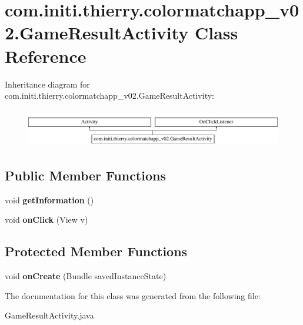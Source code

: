 \hypertarget{classcom_1_1initi_1_1thierry_1_1colormatchapp__v02_1_1_game_result_activity}{}\section{com.\+initi.\+thierry.\+colormatchapp\+\_\+v02.\+Game\+Result\+Activity Class Reference}
\label{classcom_1_1initi_1_1thierry_1_1colormatchapp__v02_1_1_game_result_activity}
Inheritance diagram for com.\+initi.\+thierry.\+colormatchapp\+\_\+v02.\+Game\+Result\+Activity\+:\begin{figure}[H]
\begin{center}
\leavevmode
\includegraphics[height=1.676647cm]{classcom_1_1initi_1_1thierry_1_1colormatchapp__v02_1_1_game_result_activity}
\end{center}
\end{figure}
\subsection*{Public Member Functions}
\begin{DoxyCompactItemize}
\item 
void {\bfseries get\+Information} ()\hypertarget{classcom_1_1initi_1_1thierry_1_1colormatchapp__v02_1_1_game_result_activity_aeba33a68079a549118052e3a180268d7}{}\label{classcom_1_1initi_1_1thierry_1_1colormatchapp__v02_1_1_game_result_activity_aeba33a68079a549118052e3a180268d7}

\item 
void {\bfseries on\+Click} (View v)\hypertarget{classcom_1_1initi_1_1thierry_1_1colormatchapp__v02_1_1_game_result_activity_a261a53afc0ec589d6520259d7c695298}{}\label{classcom_1_1initi_1_1thierry_1_1colormatchapp__v02_1_1_game_result_activity_a261a53afc0ec589d6520259d7c695298}

\end{DoxyCompactItemize}
\subsection*{Protected Member Functions}
\begin{DoxyCompactItemize}
\item 
void {\bfseries on\+Create} (Bundle saved\+Instance\+State)\hypertarget{classcom_1_1initi_1_1thierry_1_1colormatchapp__v02_1_1_game_result_activity_ac304c5a6617a296b6e33aa183e059ea5}{}\label{classcom_1_1initi_1_1thierry_1_1colormatchapp__v02_1_1_game_result_activity_ac304c5a6617a296b6e33aa183e059ea5}

\end{DoxyCompactItemize}


The documentation for this class was generated from the following file\+:\begin{DoxyCompactItemize}
\item 
Game\+Result\+Activity.\+java\end{DoxyCompactItemize}
